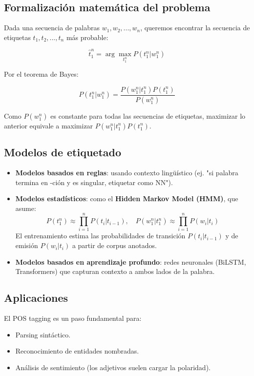 \documentclass[12pt,a4paper,openany,oneside]{book}
\begin{document}
\subsection{Formalización matemática del problema}
Dada una secuencia de palabras \( w_1, w_2, ..., w_n \), queremos encontrar la secuencia de etiquetas \( t_1, t_2, ..., t_n \) más probable:

\[
\hat{t}_1^n = \arg\max_{t_1^n} P(t_1^n | w_1^n)
\]

Por el teorema de Bayes:

\[
P(t_1^n | w_1^n) = \frac{P(w_1^n | t_1^n) P(t_1^n)}{P(w_1^n)}
\]

Como \( P(w_1^n) \) es constante para todas las secuencias de etiquetas, maximizar lo anterior equivale a maximizar \( P(w_1^n | t_1^n) P(t_1^n) \).

\subsection{Modelos de etiquetado}
\begin{itemize}
    \item \textbf{Modelos basados en reglas}: usando contexto lingüístico (ej. "si palabra termina en -ción y es singular, etiquetar como NN").
    \item \textbf{Modelos estadísticos}: como el \textbf{Hidden Markov Model (HMM)}, que asume:
    \[
    P(t_1^n) \approx \prod_{i=1}^n P(t_i | t_{i-1}), \quad
    P(w_1^n | t_1^n) \approx \prod_{i=1}^n P(w_i | t_i)
    \]
    El entrenamiento estima las probabilidades de transición \( P(t_i | t_{i-1}) \) y de emisión \( P(w_i | t_i) \) a partir de corpus anotados.
    \item \textbf{Modelos basados en aprendizaje profundo}: redes neuronales (BiLSTM, Transformers) que capturan contexto a ambos lados de la palabra.
\end{itemize}

\subsection{Aplicaciones}
El POS tagging es un paso fundamental para:
\begin{itemize}
    \item Parsing sintáctico.
    \item Reconocimiento de entidades nombradas.
    \item Análisis de sentimiento (los adjetivos suelen cargar la polaridad).
\end{itemize}
\end{document}

